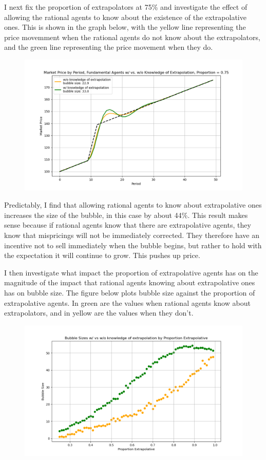 \documentclass[10pt,twocolumn]{article}
\begin{document}
I next fix the proportion of extrapolators at 75\% and investigate the effect of allowing the rational agents to know about the existence of the extrapolative ones. This is shown in the graph below, with the yellow line representing the price movemment when the rational agents do not know about the extrapolators, and the green line representing the price movement when they do.

\begin{figure}[H]
    \centering
    \includegraphics[width=0.8\linewidth]{images/bubbles2.png}
    \label{fig:enter-label}
\end{figure}
Predictably, I find that allowing rational agents to know about extrapolative ones increases the size of the bubble, in this case by about 44\%. This result makes sense because if rational agents know that there are extrapolative agents, they know that mispricings will not be immediately corrected. They therefore have an incentive not to sell immediately when the bubble begins, but rather to hold with the expectation it will continue to grow. This pushes up price. 

I then investigate what impact the proportion of extrapolative agents has on the magnitude of the impact that rational agents knowing about extrapolative ones has on bubble size. The figure below plots bubble size against the proportion of extrapolative agents. In green are the values when rational agents know about extrapolators, and in yellow are the values when they don't.

\begin{figure}[H]
    \centering
    \includegraphics[width=0.8\linewidth]{images/bubbles3.png}
    \label{fig:enter-label}
\end{figure}
\end{document}
